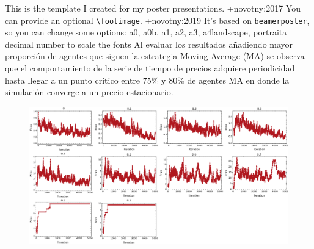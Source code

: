 \markdownRendererInterblockSeparator
{}\markdownRendererUlBegin
\markdownRendererUlItem This is the template I created for my poster presentations. +{}{}{novotny:2017}\markdownRendererUlItemEnd 
\markdownRendererUlItem You can provide an optional \texttt{\textbackslash footimage}. +{}{}{novotny:2019}\markdownRendererUlItemEnd 
\markdownRendererUlEnd \markdownRendererInterblockSeparator
{}\markdownRendererHorizontalRule{}\markdownRendererInterblockSeparator
{}\markdownRendererInterblockSeparator
{}\markdownRendererUlBegin
\markdownRendererUlItem It's based on \texttt{beamerposter}, so you can change some options:\markdownRendererInterblockSeparator
{}\markdownRendererDlBegin
{}\markdownRendererDlDefinitionBegin a0, a0b, a1, a2, a3, a4\markdownRendererDlDefinitionEnd \markdownRendererDlItemEnd {}\markdownRendererDlDefinitionBegin landscape, portrait\markdownRendererDlDefinitionEnd \markdownRendererDlItemEnd {}\markdownRendererDlDefinitionBegin a decimal number to scale the fonts\markdownRendererDlDefinitionEnd \markdownRendererDlItemEnd 
\markdownRendererDlEnd\markdownRendererUlItemEnd 
\markdownRendererUlEnd \markdownRendererInterblockSeparator
{}\markdownRendererHorizontalRule{}\markdownRendererInterblockSeparator
{}\markdownRendererInterblockSeparator
{}Al evaluar los resultados añadiendo mayor proporción de agentes que siguen la estrategia Moving Average (MA) se observa que el comportamiento de la serie de tiempo de precios adquiere periodicidad hasta llegar a un punto crítico entre 75\% y 80\% de agentes MA en donde la simulación converge a un precio estacionario.\markdownRendererInterblockSeparator
{}\begin{figure}[h!] \centering \includegraphics[scale=0.2]{img/price_series.png} \end{figure}\markdownRendererInterblockSeparator
{}\markdownRendererHorizontalRule{}\relax